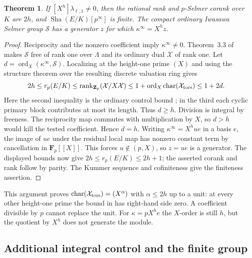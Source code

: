 \documentclass[11pt]{article}
\newtheorem{theorem}{Theorem}[section]
\newcommand{\Z}{\mathbf Z}
\newcommand{\F}{\mathbf F}
\newcommand{\ord}{\operatorname{ord}}
\begin{document}
\begin{theorem}
If $[X^h]\lambda_{\ell,1}\ne0$, then the rational rank and $p$-Selmer
corank over $K$ are $2h$, and $\operatorname{Sha}(E/K)[p^\infty]$
is finite. The compact ordinary Iwasawa Selmer group $\mathcal S$
has a generator $z$ for which $\kappa^\infty=X^h z$.
\end{theorem}
\begin{proof}
Reciprocity and the nonzero coefficient imply $\kappa^\infty\ne0$.
Theorem~3.3 of \cite{FG} makes $\mathcal S$ free of rank one over
$\Lambda$ and its ordinary dual $\mathcal X$ of rank one. Let
$d=\ord_X(\kappa^\infty,\mathcal S)$. Localizing at the height-one
prime $(X)$ and using the structure theorem over the resulting
discrete valuation ring gives
\[
  2h\le r_p(E/K)\le \operatorname{rank}_{\Z_p}(\mathcal X/X\mathcal X)
     \le 1+\ord_X\operatorname{char}(\mathcal X_{\rm tors})
     \le 1+2d .
\]
Here the second inequality is the ordinary control bound
\cite[Lem.~3.1]{FG}; in the third each cyclic primary block contributes
at most its length. Thus $d\ge h$. Division is integral by freeness.
The reciprocity map commutes with multiplication by $X$, so $d>h$
would kill the tested coefficient. Hence $d=h$. Writing
$\kappa^\infty=X^h u e$ in a basis $e$, the image of $ue$ under
the residual local map has nonzero constant term by cancellation in
$\F_p[[X]]$. This forces $u\notin(p,X)$, so $z=ue$ is a generator.
The displayed bounds now give $2h\le r_p(E/K)\le2h+1$; the asserted
corank and rank follow by parity. The Kummer sequence and cofiniteness
give the finiteness assertion.
\end{proof}

This argument proves $\operatorname{char}(\mathcal X_{\rm tors})
=(X^\alpha)$ with $\alpha\le2h$ up to a unit: at every other
height-one prime the bound in \cite[Thm.~3.3]{FG} has right-hand side
zero. A coefficient divisible by $p$ cannot replace the unit.
For $\kappa=pX^he$ the $X$-order is still $h$, but the quotient by
$X^h$ does not generate the module.

\subsection{Additional integral control and the finite group}
\end{document}
